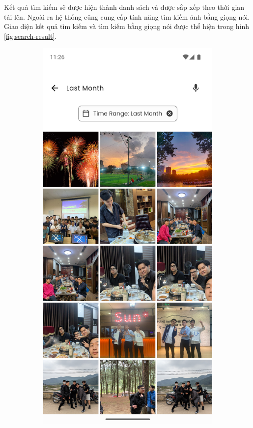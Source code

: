 Kết quả tìm kiếm sẽ được hiện thành danh sách và được sắp xếp theo thời gian tải lên. Ngoài ra hệ thống cũng cung cấp tính năng tìm kiếm ảnh bằng giọng nói. Giao diện kết quả tìm kiếm và tìm kiếm bằng giọng nói được thể hiện trong hình \ref{fig:search-result}.

\begin{figure}[H]
    \centering
    \begin{subfigure}{0.48\textwidth}
        \includegraphics[width=1\linewidth]{figures/c4/4-2/search_4.png} 

\end{subfigure}
\end{figure}

